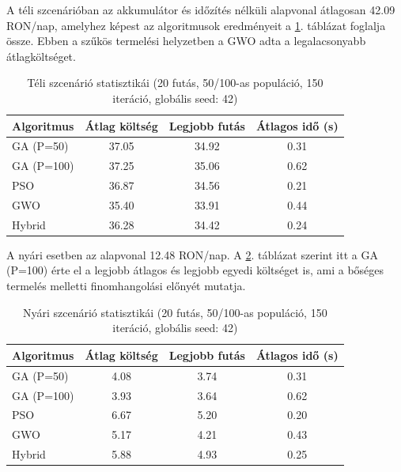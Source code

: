 A téli szcenárióban az akkumulátor és időzítés nélküli alapvonal átlagosan 42.09 RON/nap, amelyhez képest az algoritmusok eredményeit a \ref{tab:winter_stats}. táblázat foglalja össze. Ebben a szűkös termelési helyzetben a GWO adta a legalacsonyabb átlagköltséget.

\begin{table}[H]
\centering
\caption{Téli szcenárió statisztikái (20 futás, 50/100-as populáció, 150 iteráció, globális seed: 42)}
\label{tab:winter_stats}
\begin{tabular}{lccc}
\toprule
Algoritmus & Átlag költség & Legjobb futás & Átlagos idő (s) \\
\midrule
GA (P=50)  & 37.05 & 34.92 & 0.31 \\
GA (P=100) & 37.25 & 35.06 & 0.62 \\
PSO        & 36.87 & 34.56 & 0.21 \\
GWO        & 35.40 & 33.91 & 0.44 \\
Hybrid     & 36.28 & 34.42 & 0.24 \\
\bottomrule
\end{tabular}
\end{table}

A nyári esetben az alapvonal 12.48 RON/nap. A \ref{tab:summer_stats}. táblázat szerint itt a GA (P=100) érte el a legjobb átlagos és legjobb egyedi költséget is, ami a bőséges termelés melletti finomhangolási előnyét mutatja.
\begin{table}[H]
\centering
\caption{Nyári szcenárió statisztikái (20 futás, 50/100-as populáció, 150 iteráció, globális seed: 42)}
\label{tab:summer_stats}
\begin{tabular}{lccc}
\toprule
Algoritmus & Átlag költség & Legjobb futás & Átlagos idő (s) \\
\midrule
GA (P=50)  & 4.08 & 3.74 & 0.31 \\
GA (P=100) & 3.93 & 3.64 & 0.62 \\
PSO        & 6.67 & 5.20 & 0.20 \\
GWO        & 5.17 & 4.21 & 0.43 \\
Hybrid     & 5.88 & 4.93 & 0.25 \\
\bottomrule
\end{tabular}
\end{table}

